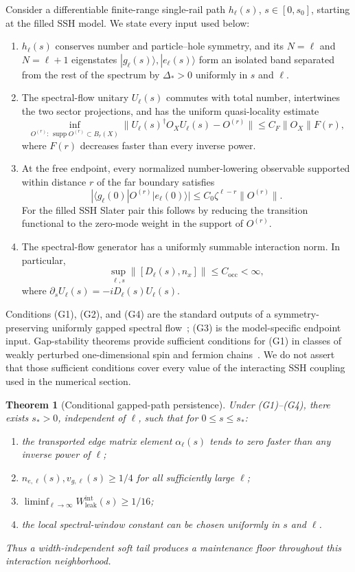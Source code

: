 \documentclass[11pt,a4paper]{article}
\newtheorem{theorem}{Theorem}[section]
\theoremstyle{remark}
\DeclareMathOperator{\supp}{supp}
\begin{document}
Consider a differentiable finite-range single-rail path $h_\ell(s)$, $s\in[0,s_0]$, starting at the filled SSH model.  We state every input used below:
\begin{enumerate}[label=(G\arabic*)]
\item $h_\ell(s)$ conserves number and particle--hole symmetry, and its $N=\ell$ and $N=\ell+1$ eigenstates $|g_\ell(s)\rangle,|e_\ell(s)\rangle$ form an isolated band separated from the rest of the spectrum by $\Delta_*>0$ uniformly in $s$ and $\ell$.
\item The spectral-flow unitary $U_\ell(s)$ commutes with total number, intertwines the two sector projections, and has the uniform quasi-locality estimate
\[
 \inf_{O^{(r)}:\,\supp O^{(r)}\subset B_r(X)}
 \|U_\ell(s)^\dagger O_XU_\ell(s)-O^{(r)}\|
 \le C_F\|O_X\|F(r),
\]
where $F(r)$ decreases faster than every inverse power.
\item At the free endpoint, every normalized number-lowering observable supported within distance $r$ of the far boundary satisfies
\[
 |\langle g_\ell(0)|O^{(r)}|e_\ell(0)\rangle|
 \le C_0\zeta^{\ell-r}\|O^{(r)}\|.
\]
For the filled SSH Slater pair this follows by reducing the transition functional to the zero-mode weight in the support of $O^{(r)}$.
\item The spectral-flow generator has a uniformly summable interaction norm.  In particular,
\[
 \sup_{\ell,s}\|[D_\ell(s),n_x]\|\le C_{\mathrm{occ}}<\infty,
\]
where $\partial_sU_\ell(s)=-iD_\ell(s)U_\ell(s)$.
\end{enumerate}
Conditions (G1), (G2), and (G4) are the standard outputs of a symmetry-preserving uniformly gapped spectral flow~\cite{HastingsWen,BachmannEtAl}; (G3) is the model-specific endpoint input.  Gap-stability theorems provide sufficient conditions for (G1) in classes of weakly perturbed one-dimensional spin and fermion chains~\cite{MoonNachtergaele}.  We do not assert that those sufficient conditions cover every value of the interacting SSH coupling used in the numerical section.

\begin{theorem}[Conditional gapped-path persistence]\label{prop:persistence}
Under (G1)--(G4), there exists $s_*>0$, independent of $\ell$, such that for $0\le s\le s_*$:
\begin{enumerate}
\item the transported edge matrix element $\alpha_\ell(s)$ tends to zero faster than any inverse power of $\ell$;
\item $n_{e,\ell}(s),v_{g,\ell}(s)\ge1/4$ for all sufficiently large $\ell$;
\item $\liminf_{\ell\to\infty}W_{\mathrm{leak}}^{\mathrm{int}}(s)\ge1/16$;
\item the local spectral-window constant can be chosen uniformly in $s$ and $\ell$.
\end{enumerate}
Thus a width-independent soft tail produces a maintenance floor throughout this interaction neighborhood.
\end{theorem}
\end{document}
